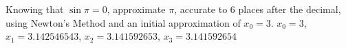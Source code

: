 {Knowing that $\sin \pi = 0$, approximate $\pi$, accurate to 6 places after the decimal, using Newton's Method and an initial approximation of $x_0=3$.
}
{$x_0=3$, $x_1=3.142546543$, $x_2=3.141592653$, $x_3=3.141592654$
}

